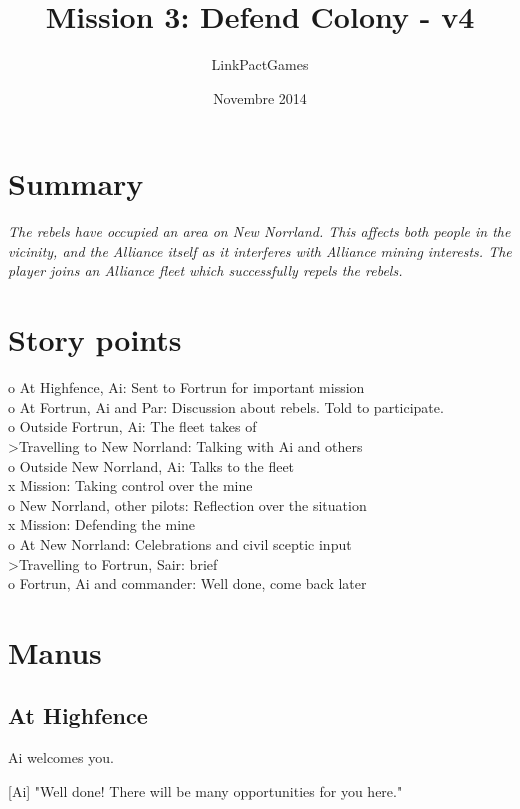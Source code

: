 \documentclass[a4paper,12pt]{article}
\begin{document}
\title{Mission 3: Defend Colony - v4}
\author{LinkPactGames}
\date{Novembre 2014}
\maketitle

\section{Summary}
\textit{The rebels have occupied an area on New Norrland. This affects both people in
the vicinity, and the Alliance itself as it interferes with Alliance
mining interests. The player joins an Alliance fleet which successfully
repels the rebels.}

\section{Story points}

o At Highfence, Ai: Sent to Fortrun for important mission\\
o At Fortrun, Ai and Par: Discussion about rebels. Told to participate.\\
o Outside Fortrun, Ai: The fleet takes of\\
\textgreater Travelling to New Norrland: Talking with Ai and others\\
o Outside New Norrland, Ai: Talks to the fleet\\
x Mission: Taking control over the mine\\
o New Norrland, other pilots: Reflection over the situation\\
x Mission: Defending the mine\\
o At New Norrland: Celebrations and civil sceptic input\\
\textgreater Travelling to Fortrun, Sair: brief\\
o Fortrun, Ai and commander: Well done, come back later

\section{Manus}

\subsection{At Highfence}

Ai welcomes you.

[Ai] "Well done! There will be many opportunities for you here."
\end{document}
